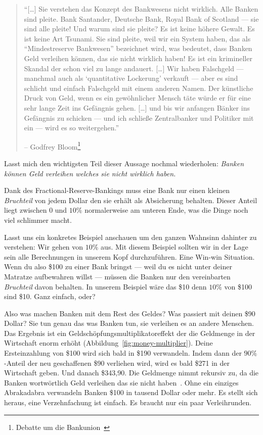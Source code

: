 \begin{quotation}\begin{samepage}
\enquote{[\ldots] Sie verstehen das Konzept des Bankwesens nicht wirklich. Alle
Banken sind pleite. Bank Santander, Deutsche Bank, Royal Bank of Scotland --- sie
sind alle pleite! Und warum sind sie pleite? Es ist keine höhere Gewalt. Es ist
keine Art Tsunami. Sie sind pleite, weil wir ein System haben, das als
“Mindestreserve Bankwesen” bezeichnet wird, was bedeutet, dass Banken Geld
verleihen können, das sie nicht wirklich haben! Es ist ein krimineller Skandal
der schon viel zu lange andauert. [\ldots]
Wir haben Falschgeld --- manchmal auch als \enquote{quantitative Lockerung}
verkauft --- aber es sind schlicht und einfach Falschgeld mit einem anderen
Namen. Der künstliche Druck von Geld, wenn es ein gewöhnlicher Mensch täte würde
er für eine sehr lange Zeit ins Gefängnis gehen. [\ldots] und bis wir anfangen
Bänker ins Gefängnis zu schicken — und ich schließe Zentralbanker und Politiker
mit ein — wird es so weitergehen.}
\begin{flushright} -- Godfrey Bloom\footnote{Debatte um die Bankunion~\cite{godfrey-bloom}}
\end{flushright}\end{samepage}\end{quotation}

Lasst mich den wichtigsten Teil dieser Aussage nochmal wiederholen:
\textit{Banken können Geld verleihen welches sie nicht wirklich haben.}

Dank des Fractional-Reserve-Bankings muss eine Bank nur einen kleinen \textit{Bruchteil}
von jedem Dollar den sie erhält als Absicherung behalten. Dieser Anteil liegt
zwischen $0$ und $10\%$ normalerweise am unteren Ende, was die Dinge noch viel
schlimmer macht.

Lasst uns ein konkretes Beispiel anschauen um den ganzen Wahnsinn dahinter zu
verstehen: Wir gehen von $10\%$ aus. Mit diesem Beispiel sollten wir in der Lage
sein alle Berechnungen in unserem Kopf durchzuführen. Eine Win-win Situation.
Wenn du also \$100 zu einer Bank bringst --- weil du es nicht unter deiner
Matratze aufbewahren willst --- müssen die Banken nur den vereinbarten
\textit{Bruchteil} davon behalten. In unserem Beispiel wäre das \$10 denn $10\%$
von \$100 sind \$10. Ganz einfach, oder?

Also was machen Banken mit dem Rest des Geldes? Was passiert mit deinen \$90
Dollar? Sie tun genau das was Banken tun, sie verleihen es an andere Menschen.
Das Ergebnis ist ein Geldschöpfungsmultiplikatoreffekt der die Geldmenge in der
Wirtschaft enorm erhöht (Abbildung~\ref{fig:money-multiplier}). Deine
Ersteinzahlung von \$100 wird sich bald in \$190 verwandeln. Indem dann der
$90\%$-Anteil der neu geschaffenen \$90 verliehen wird, wird es bald \$271 in
der Wirtschaft geben. Und danach \$343,90. Die Geldmenge nimmt rekursiv zu, da
die Banken wortwörtlich Geld verleihen das sie nicht
haben~\cite{wiki:money-multiplier}. Ohne ein einziges Abrakadabra verwandeln
Banken \$100 in tausend Dollar oder mehr. Es stellt sich heraus, eine
Verzehnfachung ist einfach. Es braucht nur ein paar Verleihrunden.

